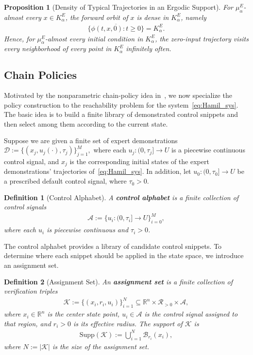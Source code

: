 \documentclass[letterpaper, 10 pt, conference]{ieeeconf}
\newtheorem{definition}{Definition}
\newtheorem{proposition}{Proposition}
\newcommand{\K}{\mathcal{K}}
\newcommand{\R}{\mathbb{R}}
\newcommand{\Supp}{\mathrm{Supp}}
\newcommand{\cB}{\mathcal{B}}
\newcommand{\cA}{\mathcal{A}}
\newcommand{\cD}{\mathcal{D}}
\begin{document}
\begin{proposition}[Density of Typical Trajectories in an Ergodic Support]
\label{proposition_density}
For $\mu_\alpha^E$-almost every $x\in K_\alpha^E$, the forward orbit of $x$ is dense in $K_\alpha^E$, namely
\begin{align*}
\overline{\{\phi(t,x,0):t\ge 0\}}=K_\alpha^E.
\end{align*}
Hence, for $\mu_\alpha^E$-almost every initial condition in $K_\alpha^E$, the zero-input trajectory visits every neighborhood of every point in $K_\alpha^E$ infinitely often.
\end{proposition}

\subsection{Chain Policies}
\label{sec:def_chain_policy}
Motivated by the nonparametric chain-policy idea in~\cite{siegelmann2025data},
we now specialize the policy construction to the reachability problem for the system~\eqref{eq:Hamil_sys}. The basic idea is to build a finite library of demonstrated control snippets and then select among them according to the current state.

Suppose we are given a finite set of expert demonstrations $\cD:=\{(x_j,u_j(\cdot),\tau_j)\}_{j=1}^M,$ where each $u_j:(0,\tau_j] \to U$ is a piecewise continuous control signal,
and $x_j$ is the corresponding initial states of the expert demonstrations' trajectories of~\eqref{eq:Hamil_sys}. In addition, let $u_0:(0,\tau_0]\to U$ be a prescribed default control signal,
where $\tau_0>0$.

\begin{definition}[Control Alphabet]
A \textbf{control alphabet} is a finite collection of control signals
\begin{align*}
\cA := \{u_i : (0, \tau_i] \to U\}_{i=0}^{M},
\end{align*}
where each $u_i$ is piecewise continuous and $\tau_i > 0$.
\end{definition}

The control alphabet provides a library of candidate control snippets. To determine where each snippet should be applied in the state space, we introduce an assignment set.

\begin{definition}[Assignment Set]
An \textbf{assignment set} is a finite collection of verification triples
\begin{align*}
\K := \{(x_i, r_i, u_i)\}_{i=1}^{N} \subseteq \R^n \times \mathcal{R}_{> 0} \times \cA,
\end{align*}
where $x_i \in \R^n$ is the center state point, $u_i \in \cA$ is the control signal assigned to that region, and $r_i > 0$ is its effective radius. The support of $\K$ is 
\begin{align*}
\Supp(\K) := \bigcup_{i=1}^{N} \cB_{r_i}(x_i),
\end{align*}
where $N:=\lvert \K \rvert$ is the size of the assignment set.
\end{definition}
\end{document}
